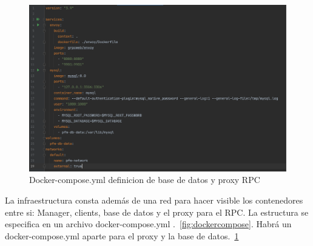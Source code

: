 \begin{figure}[H]
    \centering
    \includegraphics[scale = 0.3]{part/Proyecto_ejecutivo/memoria_constructiva/docker/docker-compose-gen}
    \caption{Docker-compose.yml definicion de base de datos y proxy RPC}\label{fig:dockercomposegen}
\end{figure}

La infraestructura consta además de una red para hacer visible los contenedores entre si: Manager, clients, base de datos y el proxy para el RPC. La estructura se especifica en un archivo docker-compose.yml .~\cref{fig:dockercompose}.
Habrá un docker-compose.yml aparte para el proxy y la base de datos.~\cref{fig:dockercomposegen}

